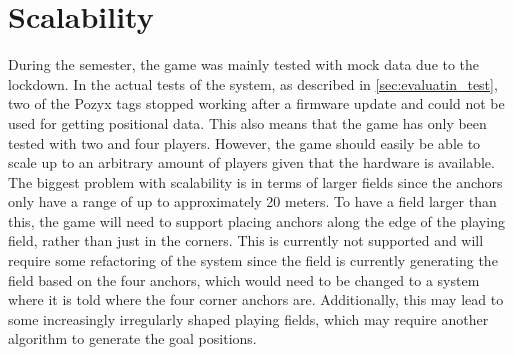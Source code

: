 \section{Scalability}
During the semester, the game was mainly tested with mock data due to the lockdown.
In the actual tests of the system, as described in \autoref{sec:evaluatin_test}, two of the Pozyx tags stopped working after a firmware update and could not be used for getting positional data.
This also means that the game has only been tested with two and four players.
However, the game should easily be able to scale up to an arbitrary amount of players given that the hardware is available.
The biggest problem with scalability is in terms of larger fields since the anchors only have a range of up to approximately 20 meters. To have a field larger than this, the game will need to support placing anchors along the edge of the playing field, rather than just in the corners.
This is currently not supported and will require some refactoring of the system since the field is currently generating the field based on the four anchors, which would need to be changed to a system where it is told where the four corner anchors are.
Additionally, this may lead to some increasingly irregularly shaped playing fields, which may require another algorithm to generate the goal positions.
